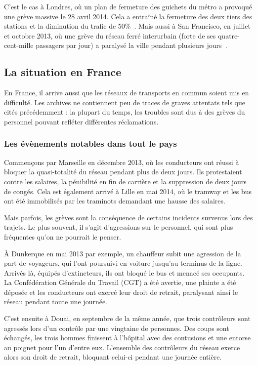             C'est le cas à Londres, où un plan de fermeture des guichets du métro a provoqué une grève massive le 28 avril 2014. Cela a entraîné la fermeture des deux tiers des stations et la diminution du trafic de 50\%~\cite{tubeApril}. Mais aussi à San Francisco, en juillet et octobre 2013, où une grève du réseau ferré interurbain (forte de ses quatre-cent-mille passagers par jour) a paralysé la ville pendant plusieurs jours~\cite{SFbart}.

    \subsection{La situation en France}
        En France, il arrive aussi que les réseaux de transports en commun soient mis en difficulté. Les archives ne contiennent peu de traces de graves attentats tels que cités précédemment : la plupart du temps, les troubles sont dus à des grèves du personnel pouvant refléter différentes réclamations.
        
        \subsubsection{Les évènements notables dans tout le pays}
            Commençons par Marseille en décembre 2013, où les conducteurs ont réussi à bloquer la quasi-totalité du réseau pendant plus de deux jours. Ils protestaient contre les salaires, la pénibilité en fin de carrière et la suppression de deux jours de congés. Cela est également arrivé à Lille en mai 2014, où le tramway et les bus ont été immobilisés par les traminots demandant une hausse des salaires.

            Mais parfois, les grèves sont la conséquence de certains incidents survenus lors des trajets. Le plus souvent, il s'agit d'agressions sur le personnel, qui sont plus fréquentes qu'on ne pourrait le penser.

            À Dunkerque en mai 2013 par exemple, un chauffeur subit une agression de la part de voyageurs, qui l'ont poursuivi en voiture jusqu'au terminus de la ligne. Arrivés là, équipés d'extincteurs, ils ont bloqué le bus et menacé ses occupants. La Confédération Générale du Travail (CGT) a été avertie, une plainte a été déposée et les conducteurs ont exercé leur droit de retrait, paralysant ainsi le réseau pendant toute une journée.

            C'est ensuite à Douai, en septembre de la même année, que trois contrôleurs sont agressés lors d'un contrôle par une vingtaine de personnes. Des coups sont échangés, les trois hommes finissent à l'hôpital avec des contusions et une entorse au poignet pour l'un d'entre eux. L'ensemble des contrôleurs du réseau exerce alors son droit de retrait, bloquant celui-ci pendant une journée entière.

